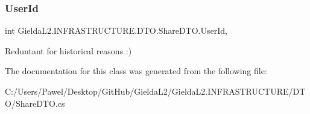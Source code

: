 \subsubsection{\texorpdfstring{UserId}{UserId}}
{\footnotesize\ttfamily int Gielda\+L2.\+I\+N\+F\+R\+A\+S\+T\+R\+U\+C\+T\+U\+R\+E.\+D\+T\+O.\+Share\+D\+T\+O.\+User\+Id\hspace{0.3cm}{\ttfamily [get]}, {\ttfamily [set]}}



Reduntant for historical reasons \+:) 



The documentation for this class was generated from the following file\+:\begin{DoxyCompactItemize}
\item 
C\+:/\+Users/\+Pawel/\+Desktop/\+Git\+Hub/\+Gielda\+L2/\+Gielda\+L2.\+I\+N\+F\+R\+A\+S\+T\+R\+U\+C\+T\+U\+R\+E/\+D\+T\+O/Share\+D\+T\+O.\+cs\end{DoxyCompactItemize}
